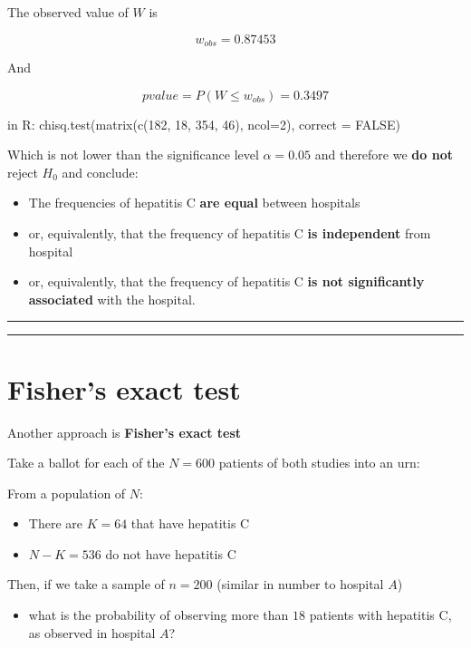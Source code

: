 \documentclass[
]{book}
\providecommand{\tightlist}{%
  \setlength{\itemsep}{0pt}\setlength{\parskip}{0pt}}
\begin{document}
The observed value of \(W\) is

\[w_{obs}= 0.87453\]

And

\[pvalue=P(W \leq w_{obs}) =0.3497\]

in R: chisq.test(matrix(c(182, 18, 354, 46), ncol=2), correct = FALSE)

Which is not lower than the significance level \(\alpha=0.05\) and therefore we \textbf{do not} reject \(H_0\) and conclude:

\begin{itemize}
\item
  The frequencies of hepatitis C \textbf{are equal} between hospitals
\item
  or, equivalently, that the frequency of hepatitis C \textbf{is independent} from hospital
\item
  or, equivalently, that the frequency of hepatitis C \textbf{is not significantly associated} with the hospital.
\end{itemize}

\begin{center}\rule{0.5\linewidth}{0.5pt}\end{center}

\begin{center}\rule{0.5\linewidth}{0.5pt}\end{center}

\hypertarget{fishers-exact-test}{%
\section{Fisher's exact test}\label{fishers-exact-test}}

Another approach is \textbf{Fisher's exact test}

Take a ballot for each of the \(N=600\) patients of both studies into an urn:

From a population of \(N\):

\begin{itemize}
\tightlist
\item
  There are \(K=64\) that have hepatitis C
\item
  \(N-K=536\) do not have hepatitis C
\end{itemize}

Then, if we take a sample of \(n=200\) (similar in number to hospital \(A\))

\begin{itemize}
\tightlist
\item
  what is the probability of observing more than \(18\) patients with hepatitis C, as observed in hospital \(A\)?
\end{itemize}
\end{document}
